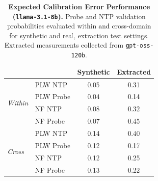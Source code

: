 \begin{table}[ht]
\centering
\begin{tabular}{ll cc}
\toprule
& & Synthetic & Extracted \\
\midrule
\multirow{4}{*}{\textit{Within}}
& PLW NTP & 0.05 & 0.31 \\
& PLW Probe & 0.04 & 0.14 \\
& NF NTP & 0.08 & 0.32 \\
& NF Probe & 0.07 & 0.45 \\
\midrule
\multirow{4}{*}{\textit{Cross}}
& PLW NTP & 0.14 & 0.40 \\
& PLW Probe & 0.12 & 0.17 \\
& NF NTP & 0.12 & 0.25 \\
& NF Probe & 0.13 & 0.22 \\
\bottomrule
\end{tabular}
\caption{\textbf{Expected Calibration Error Performance (\texttt{llama-3.1-8b}).} Probe and NTP validation probabilities evaluated within and cross-domain for synthetic and real, extraction test settings. Extracted measurements collected from \texttt{gpt-oss-120b}.}
\label{tab:llama-3.1-8b-gpt-oss-120b}
\end{table}
